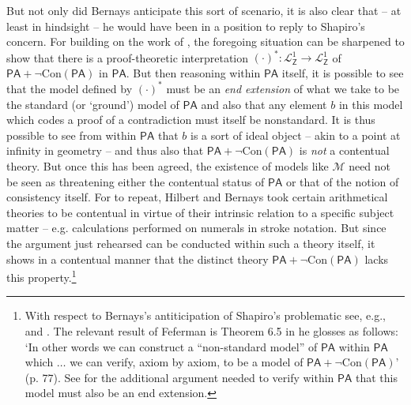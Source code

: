 \documentclass[11pt,fleqn,leqno]{article}
\begin{document}
But not only did Bernays anticipate this sort of scenario, it is also clear that -- at least in hindsight -- he would have been in a position to reply to Shapiro's concern.   For building on the work of \citet{Feferman1960}, the foregoing situation can be sharpened to show that there is a proof-theoretic interpretation $(\cdot)^*: \mathcal{L}^1_{\mathsf{Z}} \rightarrow \mathcal{L}^1_{\mathsf{Z}}$ of $\mathsf{PA} + \neg \mathrm{Con}(\mathsf{PA})$ in $\mathsf{PA}$.    But then reasoning within $\mathsf{PA}$ itself, it is possible to see that the model defined by $(\cdot)^*$ must be an \textsl{end extension} of what we take to be the standard (or `ground') model of $\mathsf{PA}$ and also that any element $b$ in this model which codes a proof of a contradiction must itself be nonstandard.   It is thus possible to see from within $\mathsf{PA}$ that $b$ is a sort of ideal object -- akin to a point at infinity in geometry -- and thus also that $\mathsf{PA} + \neg \mathrm{Con}(\mathsf{PA})$ is \textsl{not} a contentual theory.  But once this has been agreed, the existence of models like $\mathcal{M}$ need not be seen as threatening either the contentual status of $\mathsf{PA}$ or that of the notion of consistency itself.  For to repeat, Hilbert and Bernays took certain arithmetical theories to be contentual in virtue of their intrinsic relation to a specific subject matter -- e.g. calculations performed on numerals in stroke notation.  But since the argument just rehearsed can be conducted within such a theory itself, it shows in a contentual manner that the distinct theory $\mathsf{PA} + \neg \mathrm{Con}(\mathsf{PA})$ lacks this property.\footnote{With respect to Bernays's antiticipation of Shapiro's problematic see, e.g., \citeyearpar[p. 101]{Bernays1950} and \citeyearpar[p. 118]{Bernays1957}.  The relevant result of Feferman is Theorem 6.5 in \citeyearpar{Feferman1960} he glosses as follows: `In other words we can construct a ``non-standard model'' of $\mathsf{PA}$ within $\mathsf{PA}$ which $\ldots$ we can verify, axiom by axiom, to be a model of $\mathsf{PA} + \neg \mathrm{Con}(\mathsf{PA})$' (p. 77).   See \citep[pp. 14-15]{Dean2019a} for the additional argument needed to verify within $\mathsf{PA}$ that this model must also be an end extension.}
\end{document}
